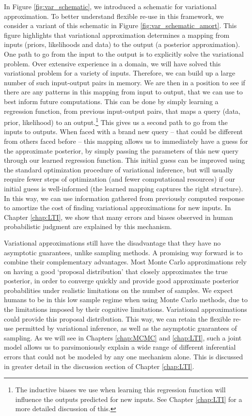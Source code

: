 In Figure \ref{fig:var_schematic}, we introduced a schematic for variational approximation. To better understand flexible re-use in this framework, we consider a variant of this schematic in Figure \ref{fig:var_schematic_amort}. This figure highlights that variational approximation determines a mapping from inputs (priors, likelihoods and data) to the output (a posterior approximation). One path to go from the input to the output is to explicitly solve the variational problem. Over extensive experience in a domain, we will have solved this variational problem for a variety of inputs. Therefore, we can build up a large number of such input-output pairs in memory. We are then in a position to see if there are any patterns in this mapping from input to output, that we can use to best inform future computations. This can be done by simply learning a regression function, from previous input-output pairs, that maps a query (data, prior, likelihood) to an output.\footnote{The inductive biases we use when learning this regression function will influence the outputs predicted for new inputs. See Chapter \ref{chap:LTI} for a more detailed discussion of this.} This gives us a second path to go from the inputs to outputs. When faced with a brand new query -- that could be different from others faced before -- this mapping allows us to immediately have a guess for the approximate posterior, by simply passing the parameters of this new query through our learned regression function. This initial guess can be improved using the standard optimization procedure of variational inference, but will usually require fewer steps of optimization (and fewer computational resources) if our initial guess is well-informed (the learned mapping captures the right structure). In this way, we can use information gathered from previously computed response to amortize the cost of finding variational approximations for new inputs. In Chapter \ref{chap:LTI}, we show that many errors and biases observed in human probabilistic judgment are explained by this mechanism.

Variational approximations still have the disadvantage that they have no asymptotic guarantees, unlike sampling methods. A promising way forward is to combine their complementary advantages. Most Monte Carlo approximations rely on having a good `proposal distribution' that closely approximates the true posterior, in order to converge quickly and provide good approximate posterior probabilities under realistic limitations on the number of samples. We expect humans to be in this low sample regime when using Monte Carlo methods, due to the limitations imposed by their cognitive limitations. Variational approximations could provide this proposal distribution. This way, we can retain the flexible re-use permitted by variational inference, as well as the asymptotic guarantees of sampling. As we will see in Chapters \ref{chap:MCMC} and \ref{chap:LTI}, such a joint model allows us to parsimoniously explain a wide range of different inferential errors that could not be modeled by any one mechanism alone. This is discussed in greater detail in the discussion section of Chapter \ref{chap:LTI}.

